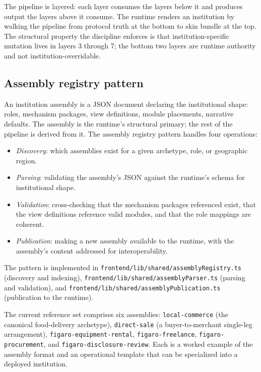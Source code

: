 \documentclass[11pt,a4paper]{article}
\theoremstyle{definition}
\theoremstyle{remark}
\begin{document}
The pipeline is layered: each layer consumes the layers below it
and produces output the layers above it consume. The runtime renders
an institution by walking the pipeline from protocol truth at the
bottom to skin bundle at the top. The structural property the
discipline enforces is that institution-specific mutation lives in
layers 3 through 7; the bottom two layers are runtime authority and
not institution-overridable.

\subsection{Assembly registry pattern}

An institution assembly is a JSON document declaring the
institutional shape: roles, mechanism packages, view definitions,
module placements, narrative defaults. The assembly is the runtime's
structural primary; the rest of the pipeline is derived from it. The
assembly registry pattern handles four operations:

\begin{itemize}
  \item \emph{Discovery}: which assemblies exist for a given
    archetype, role, or geographic region.
  \item \emph{Parsing}: validating the assembly's JSON against the
    runtime's schema for institutional shape.
  \item \emph{Validation}: cross-checking that the mechanism packages
    referenced exist, that the view definitions reference valid
    modules, and that the role mappings are coherent.
  \item \emph{Publication}: making a new assembly available to the
    runtime, with the assembly's content addressed for
    interoperability.
\end{itemize}

The pattern is implemented in
\texttt{frontend/lib/shared/assemblyRegistry.ts} (discovery and
indexing), \texttt{frontend/lib/shared/assemblyParser.ts} (parsing
and validation), and
\texttt{frontend/lib/shared/assemblyPublication.ts} (publication to
the runtime).

The current reference set comprises six assemblies:
\texttt{local-commerce} (the canonical food-delivery archetype),
\texttt{direct-sale} (a buyer-to-merchant single-leg arrangement),
\texttt{figaro-equipment-rental}, \texttt{figaro-freelance},
\texttt{figaro-procurement}, and
\texttt{figaro-disclosure-review}. Each is a worked example of the
assembly format and an operational template that can be specialized
into a deployed institution.
\end{document}
